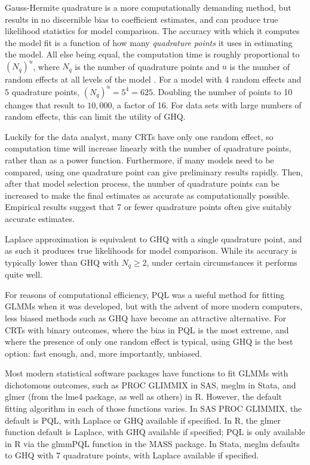 \documentclass[Afour,times,sagev,doublespace]{sagej}
\begin{document}
Gauss-Hermite quadrature is a more computationally demanding method, but results in no discernible bias to coefficient estimates, and can produce true likelihood statistics for model comparison. The accuracy with which it computes the model fit is a function of how many \textit{quadrature points} it uses in estimating the model. All else being equal, the computation time is roughly proportional to $(N_q)^u$, where $N_q$ is the number of quadrature points and $u$ is the number of random effects at all levels of the model \cite{statacorp_stata_2017}\cite{pinheiro_efficient_2006}. For a model with 4 random effects and 5 quadrature points, $(N_q)^u = 5^4 = 625$. Doubling the number of points to 10 changes that result to $10,000$, a factor of 16. For data sets with large numbers of random effects, this can limit the utility of GHQ.

Luckily for the data analyst, many CRTs have only one random effect, so computation time will increase linearly with the number of quadrature points, rather than as a power function. Furthermore, if many models need to be compared, using one quadrature point can give preliminary results rapidly. Then, after that model selection process, the number of quadrature points can be increased to make the final estimates as accurate as computationally possible. Empirical results suggest that 7 or fewer quadrature points often give suitably accurate estimates\cite{pinheiro_approximations_1995}.

Laplace approximation is equivalent to GHQ with a single quadrature point\cite{liu_note_1994}, and as such it produces true likelihoods for model comparison. While its accuracy is typically lower than GHQ with $N_q\geq2$, under certain circumstances it performs quite well\cite{liu_note_1994}.

For reasons of computational efficiency, PQL was a useful method for fitting GLMMs when it was developed, but with the advent of more modern computers, less biased methods such as GHQ have become an attractive alternative. For CRTs with binary outcomes, where the bias in PQL is the most extreme\cite{ng_estimation_2006}\cite{lin_estimation_2007}, and where the presence of only one random effect is typical, using GHQ is the best option: fast enough, and, more importantly, unbiased.

Most modern statistical software packages have functions to fit GLMMs with dichotomous outcomes, such as PROC GLIMMIX in SAS, meglm in Stata, and glmer (from the lme4 package, as well as others) in R. However, the default fitting algorithm in each of those functions varies. In SAS PROC GLIMMIX, the default is PQL, with Laplace or GHQ available if specified. In R, the glmer function default is Laplace, with GHQ available if specified; PQL is only available in R via the glmmPQL function in the MASS package. In Stata, meglm defaults to GHQ with 7 quadrature points, with Laplace available if specified.
\end{document}
